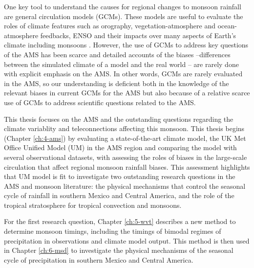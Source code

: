 
One key tool to understand the causes for regional changes to monsoon rainfall are general circulation models (GCMs). These models are useful to evaluate the roles of climate features such as orography, vegetation-atmosphere and ocean-atmosphere feedbacks, ENSO and their impacts over many aspects of Earth's climate including monsoons \citep{zhou2016}. However, the use of GCMs to address key questions of the AMS has been scarce and detailed accounts of the biases --differences between the simulated climate of a model and the real world -- are rarely done with explicit emphasis on the AMS. 
In other words, GCMs are rarely evaluated in the AMS, so our understanding is deficient both in the knowledge of the relevant biases in current GCMs for the AMS but also because of a relative scarce use of GCMs to address scientific questions related to the AMS. 


 This thesis focuses on the AMS and the outstanding questions regarding the climate variablity and teleconnections affecting this monsoon.
 This thesis begins (Chapter \ref{ch:4-ams}) by evaluating a state-of-the-art climate model, the UK Met Office Unified Model (UM) in the AMS region and comparing the model with several observational datasets, with assessing the roles of biases in the large-scale circulation that affect regional monsoon rainfall biases.
 This assessment highlights that UM model is fit to investigate two outstanding research questions in the AMS and monsoon literature: the physical mechanisms that control the seasonal cycle of rainfall in southern Mexico and Central America, and the role of the tropical stratosphere for tropical convection and monsoons. 
 
 For the first research question, Chapter \ref{ch:5-wvt} describes a new method to determine monsoon timings, including the timings of bimodal regimes of precipitation in observations and climate model output. This method is then used in Chapter \ref{ch:6-msd} to investigate the physical mechanisms of the seasonal cycle of precipitation in southern Mexico and Central America.
 
